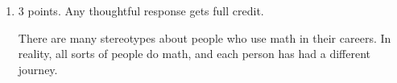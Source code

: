 \documentclass{article}
\begin{document}
\begin{enumerate}
  \begin{solution}
    The slope of the secant line is 
    \begin{align*} 
      \frac{ f(3+k) - f(3) }{3+k - 3}  &=  \frac{\frac{  3}{3+k} +2
        (3+k) - \left( \frac{3}{3} + 6 \right)}{k} \\
      &= \frac{\frac{  3}{3+k} +2k - 1}{k} \\
      \intertext{To get rid of the denominator $3 + k$ in the
        numerator, let's strategically multiply this by 1 (which
        doesn't change the expression):}
      &= \frac{\frac{  3}{3+k} +2k - 1}{k} \cdot \frac{3 + k}{3 + k}
      \\
      &= \frac{3 + 2k (3 + k) - (3 + k)}{k (3 + k)} \\
      &= \frac{2k^2 + 5k}{k (3 + k)} \\
      &= \frac{k (2k + 5)}{k (3 + k)} \\
      \intertext{Since $k \neq 0$, we can cancel the $k$ in the numerator and the $k$ in the denominator:} %
      & =  \boxed{ \frac{  2 k + 5}{3+k} }
    \end{align*}  
  \end{solution}

\item 

  \begin{grading}
    3 points. Any thoughtful response gets full credit. 
  \end{grading}

  \begin{problem}[\vfill]
    There are many stereotypes about people who use math in their careers. In reality, all sorts of people do math, and each person has had a different journey.


\end{problem}
\end{enumerate}
\end{document}

